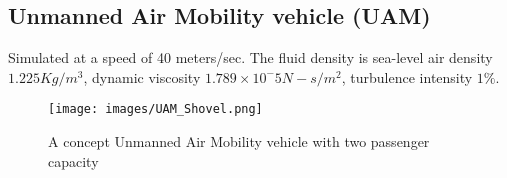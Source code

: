 
\subsection{Unmanned Air Mobility vehicle (UAM)}
Simulated at a speed of 40 meters/sec. The fluid density is sea-level air density $1.225 Kg/m^3$, dynamic viscosity $1.789\times10^-5 N-s/m^2$, turbulence intensity $1\%$. 
\begin{figure}[h]
    \centering
    \texttt{[image: images/UAM\_Shovel.png]}
    \caption{A concept Unmanned Air Mobility vehicle with two passenger capacity }
    \label{fig:uuv_sim}
\end{figure}
